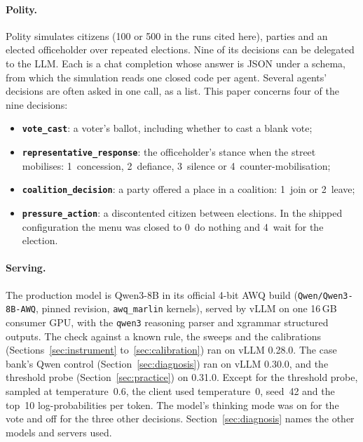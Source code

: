 \documentclass[11pt]{article}
\newcommand{\code}[1]{\texttt{#1}}
\begin{document}
\paragraph{Polity.} Polity simulates citizens (100 or 500 in the runs cited here), parties and an
elected officeholder over repeated elections. Nine of its decisions can be delegated to the LLM.
Each is a chat completion whose answer is JSON under a schema, from which the simulation reads
one closed code per agent. Several agents' decisions are often asked in one call, as a list. This
paper concerns four of the nine decisions:
\begin{itemize}
  \item \textbf{\code{vote\_cast}}: a voter's ballot, including whether to cast a blank vote;
  \item \textbf{\code{representative\_response}}: the officeholder's stance when the street
    mobilises: 1~concession, 2~defiance, 3~silence or 4~counter-mobilisation;
  \item \textbf{\code{coalition\_decision}}: a party offered a place in a coalition: 1~join or
    2~leave;
  \item \textbf{\code{pressure\_action}}: a discontented citizen between elections. In the shipped
    configuration the menu was closed to 0~do nothing and 4~wait for the election.
\end{itemize}

\paragraph{Serving.} The production model is Qwen3-8B \citep{qwen2025qwen3} in its official
4-bit AWQ build (\code{Qwen/Qwen3-8B-AWQ}, pinned revision, \code{awq\_marlin} kernels), served by
vLLM \citep{kwon2023vllm} on one 16\,GB consumer GPU, with the \code{qwen3} reasoning parser and
xgrammar structured outputs. The check against a known rule, the sweeps and the calibrations
(Sections~\ref{sec:instrument} to~\ref{sec:calibration}) ran on vLLM 0.28.0. The case bank's Qwen
control (Section~\ref{sec:diagnosis}) ran on vLLM 0.30.0, and the threshold probe
(Section~\ref{sec:practice}) on 0.31.0. Except for the threshold probe, sampled at
temperature~0.6, the client used temperature~0, seed~42 and the top~10 log-probabilities per token. The model's thinking mode was
on for the vote and off for the three other decisions. Section~\ref{sec:diagnosis} names the
other models and servers used.

\end{document}
